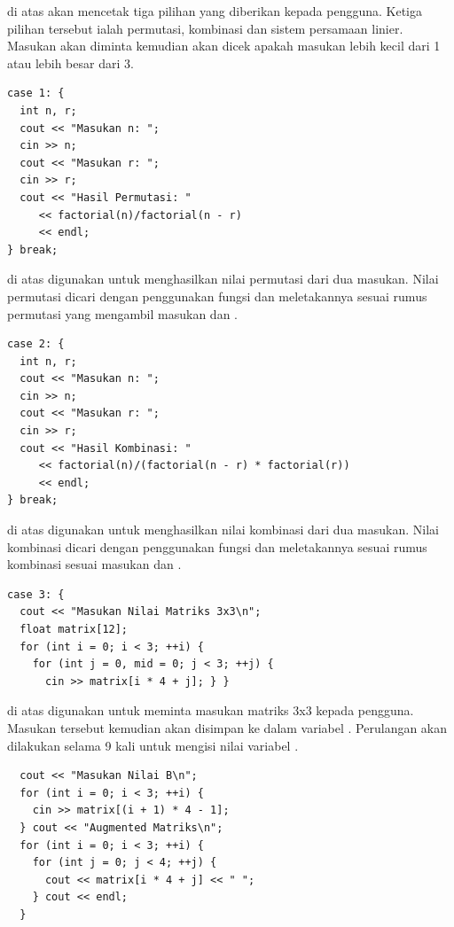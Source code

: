 \documentclass[../main.tex]{subfiles}
\begin{document}
{\Script} di atas akan mencetak tiga pilihan yang diberikan kepada pengguna. Ketiga pilihan tersebut ialah permutasi, kombinasi dan sistem persamaan linier. Masukan akan diminta kemudian akan dicek apakah masukan lebih kecil dari 1 atau lebih besar dari 3.

\begin{code}
\begin{verbatim}
case 1: {
  int n, r;
  cout << "Masukan n: ";
  cin >> n;
  cout << "Masukan r: ";
  cin >> r;
  cout << "Hasil Permutasi: " 
     << factorial(n)/factorial(n - r)
     << endl;
} break;
\end{verbatim}
\end{code}

{\Script} di atas digunakan untuk menghasilkan nilai permutasi dari dua masukan. Nilai permutasi dicari dengan penggunakan fungsi  dan meletakannya sesuai rumus permutasi yang mengambil masukan  dan .

\begin{code}
\begin{verbatim}
case 2: {
  int n, r;
  cout << "Masukan n: ";
  cin >> n;
  cout << "Masukan r: ";
  cin >> r;
  cout << "Hasil Kombinasi: " 
     << factorial(n)/(factorial(n - r) * factorial(r))
     << endl;
} break;
\end{verbatim}
\end{code}

{\Script} di atas digunakan untuk menghasilkan nilai kombinasi dari dua masukan. Nilai kombinasi dicari dengan penggunakan fungsi  dan meletakannya sesuai rumus kombinasi sesuai masukan  dan .

\begin{code}
\begin{verbatim}
case 3: {
  cout << "Masukan Nilai Matriks 3x3\n";
  float matrix[12];
  for (int i = 0; i < 3; ++i) {
    for (int j = 0, mid = 0; j < 3; ++j) {
      cin >> matrix[i * 4 + j]; } }
\end{verbatim}
\end{code}

{\Script} di atas digunakan untuk meminta masukan matriks 3x3 kepada pengguna. Masukan tersebut kemudian akan disimpan ke dalam variabel {\sarray} . Perulangan akan dilakukan selama 9 kali untuk mengisi nilai variabel {\sarray} .

\begin{code}
\begin{verbatim}
  cout << "Masukan Nilai B\n";
  for (int i = 0; i < 3; ++i) {
    cin >> matrix[(i + 1) * 4 - 1];
  } cout << "Augmented Matriks\n";
  for (int i = 0; i < 3; ++i) {
    for (int j = 0; j < 4; ++j) {
      cout << matrix[i * 4 + j] << " ";
    } cout << endl;
  }
\end{verbatim}
\end{code}
\end{document}
